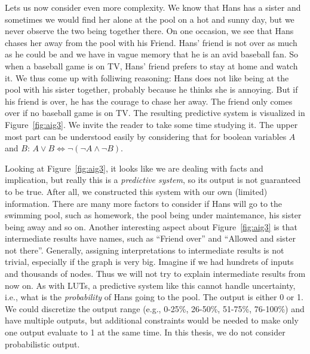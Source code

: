 \noindent Lets us now consider even more complexity. We know that Hans has a sister and sometimes we would find her alone at the pool on a hot and sunny day, but we never observe the two being together there. On one occasion, we see that Hans chases her away from the pool with his Friend. Hans' friend is not over as much as he could be and we have in vague memory that he is an avid baseball fan. So when a baseball game is on TV, Hans' friend prefers to stay at home and watch it. We thus come up with folliwing reasoning: Hans does not like being at the pool with his sister together, probably because he thinks she is annoying. But if his friend is over, he has the courage to chase her away. The friend only comes over if no baseball game is on TV. The resulting predictive system is visualized in Figure~\ref{fig:aig3}. We invite the reader to take some time studying it. The upper most part can be understood easily by considering that for boolean variables $A$ and $B$: $A \vee B \Leftrightarrow \lnot (\lnot A \wedge \lnot B)$.


Looking at Figure~\ref{fig:aig3}, it looks like we are dealing with facts and implication, but really this is a \textit{predictive system}, so its output is not guaranteed to be true. After all, we constructed this system with our own (limited) information. There are many more factors to consider if Hans will go to the swimming pool, such as homework, the pool being under maintemance, his sister being away and so on. Another interesting aspect about Figure~\ref{fig:aig3} is that intermediate results have names, such as \enquote{Friend over} and \enquote{Allowed and sister not there}. Generally, assigning interpretations to intermediate results is not trivial, especially if the graph is very big. Imagine if we had hundrets of inputs and thousands of nodes. Thus we will not try to explain intermediate results from now on. As with LUTs, a predictive system like this cannot handle uncertainty, i.e., what is the \textit{probability} of Hans going to the pool. The output is either 0 or 1. We could discretize the output range (e.g., 0-25\%, 26-50\%, 51-75\%, 76-100\%) and have multiple outputs, but additional constraints would be needed to make only one output evaluate to 1 at the same time. In this thesis, we do not consider probabilistic output.

